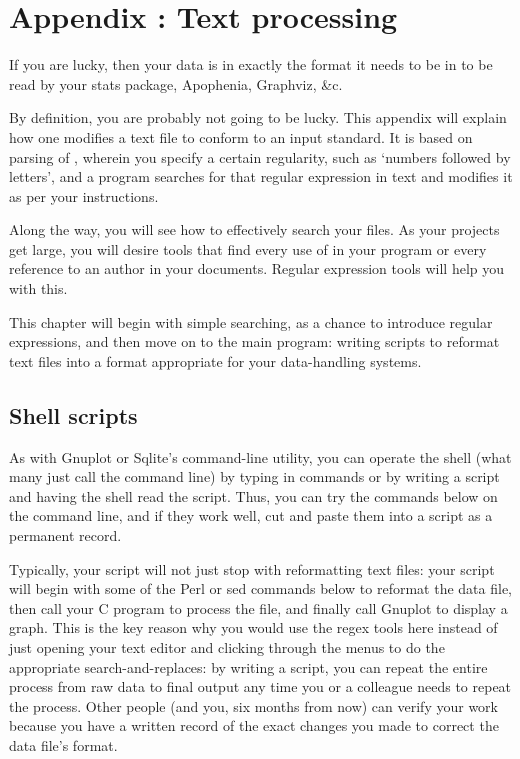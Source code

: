 \renewcommand\thechapter{\Alph{chapter}}
\setcounter{chapter}{1}
\setcounter{section}{0}
\setcounter{subsection}{0}
\setcounter{ex}{0}
\chapter{Appendix \thechapter: Text processing} \label{textappendix}

If you are lucky, then your data is in exactly the format it needs to be
in to be read by your stats package, Apophenia, Graphviz, \&c.

By definition, you are probably not going to be lucky. This appendix will
explain how one modifies a text file to conform to an input standard. It
is based on parsing of , wherein you specify a
certain regularity, such as `numbers followed by letters', and a program
searches for that regular expression in text and modifies it as per
your instructions.

Along the way, you will see how to effectively search your files. As
your projects get large, you will desire tools that find every use of
 in your program or every reference to an author in
your documents. Regular expression tools will help you with this.

This chapter will begin with simple searching, as a chance to introduce
regular expressions, and then move on to the main program: writing
scripts to reformat text files into a format appropriate for your
data-handling systems.

\section{Shell scripts} As with Gnuplot or Sqlite's command-line
utility, you can operate the shell (what many just call the command line)
by typing in commands or by writing a script and having the shell read
the script. Thus, you can try the commands below on the command line,
and if they work well, cut and paste them into a script as a permanent
record. 

Typically, your script will not just stop with reformatting text files:
your script will begin with some of the Perl or sed commands below to
reformat the data file, then call your C program to process the file, and
finally call Gnuplot to display a graph. This is the key reason why you
would use the regex tools here instead of just opening your text editor
and clicking through the menus to do the appropriate search-and-replaces:
by writing a script, you can repeat the entire process from raw data to
final output any time you or a colleague needs to repeat the process.
Other people (and you, six months from now) can verify your work because
you have a written record of the exact changes you made to correct the
data file's format.

